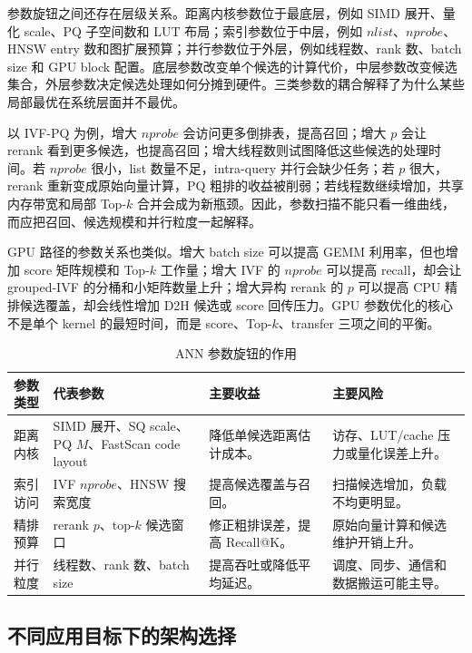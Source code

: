 \documentclass[a4paper,11pt,UTF8]{ctexart}
\begin{document}
参数旋钮之间还存在层级关系。距离内核参数位于最底层，例如 SIMD 展开、量化 scale、PQ 子空间数和 LUT 布局；索引参数位于中层，例如 $nlist$、$nprobe$、HNSW entry 数和图扩展预算；并行参数位于外层，例如线程数、rank 数、batch size 和 GPU block 配置。底层参数改变单个候选的计算代价，中层参数改变候选集合，外层参数决定候选处理如何分摊到硬件。三类参数的耦合解释了为什么某些局部最优在系统层面并不最优。

以 IVF-PQ 为例，增大 $nprobe$ 会访问更多倒排表，提高召回；增大 $p$ 会让 rerank 看到更多候选，也提高召回；增大线程数则试图降低这些候选的处理时间。若 $nprobe$ 很小，list 数量不足，intra-query 并行会缺少任务；若 $p$ 很大，rerank 重新变成原始向量计算，PQ 粗排的收益被削弱；若线程数继续增加，共享内存带宽和局部 Top-$k$ 合并会成为新瓶颈。因此，参数扫描不能只看一维曲线，而应把召回、候选规模和并行粒度一起解释。

GPU 路径的参数关系也类似。增大 batch size 可以提高 GEMM 利用率，但也增加 score 矩阵规模和 Top-$k$ 工作量；增大 IVF 的 $nprobe$ 可以提高 recall，却会让 grouped-IVF 的分桶和小矩阵数量上升；增大异构 rerank 的 $p$ 可以提高 CPU 精排候选覆盖，却会线性增加 D2H 候选或 score 回传压力。GPU 参数优化的核心不是单个 kernel 的最短时间，而是 score、Top-$k$、transfer 三项之间的平衡。

\begin{table}[H]
  \centering\footnotesize
  \begin{tabularx}{\textwidth}{p{2.6cm}p{3.2cm}p{3.0cm}Y}
    \toprule
    参数类型 & 代表参数 & 主要收益 & 主要风险 \\
    \midrule
    距离内核 & SIMD 展开、SQ scale、PQ $M$、FastScan code layout & 降低单候选距离估计成本。 & 访存、LUT/cache 压力或量化误差上升。 \\
    索引访问 & IVF $nprobe$、HNSW 搜索宽度 & 提高候选覆盖与召回。 & 扫描候选增加，负载不均更明显。 \\
    精排预算 & rerank $p$、top-$k$ 候选窗口 & 修正粗排误差，提高 Recall@K。 & 原始向量计算和候选维护开销上升。 \\
    并行粒度 & 线程数、rank 数、batch size & 提高吞吐或降低平均延迟。 & 调度、同步、通信和数据搬运可能主导。 \\
    \bottomrule
  \end{tabularx}
  \caption{ANN 参数旋钮的作用}
  \label{tab:param-knobs}
\end{table}

\subsection{不同应用目标下的架构选择}
\end{document}
